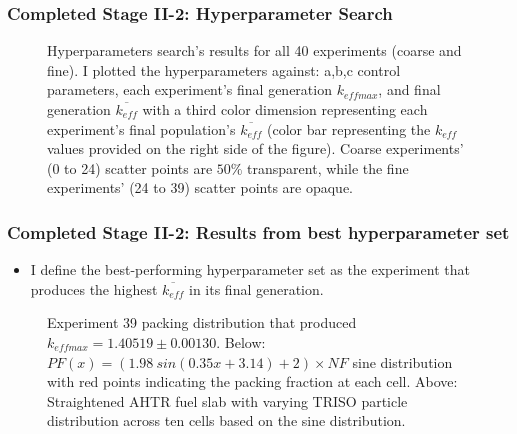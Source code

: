 \begin{frame}
    \frametitle{Completed Stage II-2: Hyperparameter Search}
    \begin{figure}[]
        \centering
        \caption{Hyperparameters search's results for all 40 experiments (coarse 
        and fine). I plotted the hyperparameters against: a,b,c control parameters, 
        each experiment's final generation $k_{eff max}$, and final generation 
        $\overline{k_{eff}}$ with a third color dimension representing each experiment's final 
        population's $\overline{k_{eff}}$ (color bar representing the $k_{eff}$ values 
        provided on the right side of the figure). Coarse experiments' (0 to 24) scatter points 
        are $50\%$ transparent, while the fine experiments' (24 to 39) scatter points 
        are opaque.}
    \end{figure}
\end{frame}

\begin{frame}
    \frametitle{Completed Stage II-2: Results from best hyperparameter set}
    \begin{itemize}
        \item I define the best-performing hyperparameter set as the experiment that produces 
        the highest $\overline{k_{eff}}$ in its final generation. 
    \end{itemize}
    \begin{figure}[]
        \centering
        \caption{Experiment 39 packing distribution that produced $k_{eff max} = 1.40519 \pm 0.00130$. 
        Below: $PF(x) = (1.98\ sin(0.35x+3.14)+2)  \times NF$ sine distribution with 
        red points indicating the packing fraction at each cell. 
        Above: Straightened AHTR fuel slab with varying TRISO particle 
        distribution across ten cells based on the sine distribution. }
        \label{fig:triso_distribution_sine_39}
    \end{figure}
    
\end{frame}